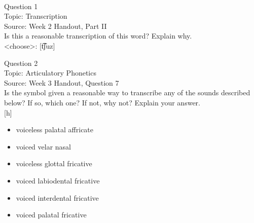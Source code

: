 \documentclass[12pt]{article}
\begin{document}
\newpage

\begin{center}
\textbf{{\color{red}{\HUGE END OF EXAM}}}\\

\end{center}
\newpage

\begin{center}
\textbf{{\color{blue}{\HUGE START OF EXAM\\}}}

\textbf{{\color{blue}{\HUGE Student ID: 89930\\}}}

\textbf{{\color{blue}{\HUGE \\}}}

\end{center}
\newpage

{\large Question 1}\\

Topic: Transcription\\
Source: Week 2 Handout, Part II\\

Is this a reasonable transcription of this word? Explain why.\\

<choose>: {[t͡ʃuz]}


\newpage

{\large Question 2}\\

Topic: Articulatory Phonetics\\
Source: Week 3 Handout, Question 7\\

Is the symbol given a reasonable way to transcribe any of the sounds described below? If so, which one? If not, why not? Explain your answer.\\

{[h]}

\begin{itemize} \item voiceless palatal affricate \item voiced velar nasal \item voiceless glottal fricative \item voiced labiodental fricative \item voiced interdental fricative \item voiced palatal fricative \end{itemize}


\newpage
\end{document}
